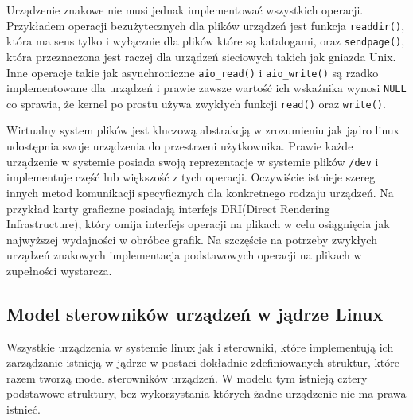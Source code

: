 \documentclass[10pt]{scrartcl}
\begin{document}
Urządzenie znakowe nie musi jednak implementować wszystkich operacji.  Przykładem operacji bezużytecznych dla plików urządzeń jest funkcja \texttt{readdir()}, która ma sens tylko i wyłącznie dla plików które są katalogami, oraz \texttt{sendpage()}, która przeznaczona jest raczej dla urządzeń sieciowych takich jak gniazda Unix. Inne operacje takie jak asynchroniczne \texttt{aio\_read()} i \texttt{aio\_write()} są rzadko implementowane dla urządzeń i prawie zawsze wartość ich wskaźnika wynosi \texttt{NULL} co sprawia, że kernel po prostu używa zwykłych funkcji \texttt{read()} oraz \texttt{write()}.

Wirtualny system plików jest kluczową abstrakcją w zrozumieniu jak jądro linux udostępnia swoje urządzenia do przestrzeni użytkownika. Prawie każde urządzenie w systemie posiada swoją reprezentacje w systemie plików \texttt{/dev} i implementuje część lub większość z tych operacji. Oczywiście istnieje szereg innych metod komunikacji specyficznych dla konkretnego rodzaju urządzeń. Na przykład karty graficzne posiadają interfejs DRI(Direct Rendering Infrastructure), który omija interfejs operacji na plikach w celu osiągnięcia jak najwyższej wydajności w obróbce grafik. Na szczęście na potrzeby zwykłych urządzeń znakowych implementacja podstawowych operacji na plikach w zupełności wystarcza.

\subsection{Model sterowników urządzeń w jądrze Linux}
\label{linuxdrivermodel}

Wszystkie urządzenia w systemie linux jak i sterowniki, które implementują ich zarządzanie istnieją w jądrze w postaci dokładnie zdefiniowanych struktur, które razem tworzą model sterowników urządzeń.  W modelu tym istnieją cztery podstawowe struktury, bez wykorzystania których żadne urządzenie nie ma prawa istnieć.
\end{document}
